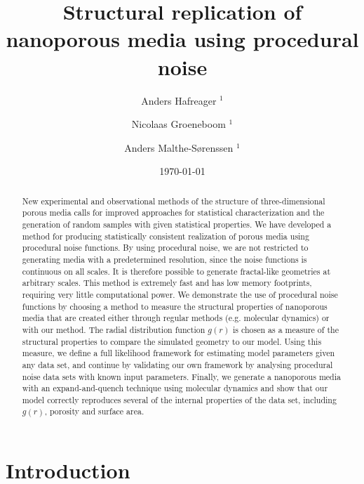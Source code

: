 \documentclass[aps,pre,twocolumn,letterpaper,floatfix,showpacs]{revtex4}
\begin{document}
\title{Structural replication of nanoporous media using procedural noise}
\author{Anders Hafreager $^{1}$} 
\author{Nicolaas Groeneboom $^{1}$} 
\author{Anders Malthe-S\o renssen $^1$}
\date{\today} 

\begin{abstract} 
New experimental and observational methods of the structure of three-dimensional porous media calls for improved approaches for statistical characterization and the generation of random samples with given statistical properties. 
We have developed a method for producing statistically consistent realization of porous media using procedural noise functions. By using procedural noise, we are not restricted to generating media with a predetermined resolution, since the noise functions is continuous on all scales. It is therefore possible to generate fractal-like geometries at arbitrary scales. This method is extremely fast and has low memory footprints, requiring very little computational power. We demonstrate the use of procedural noise functions by choosing a method to measure the structural properties of nanoporous media that are created either through regular methods (e.g. molecular dynamics) or with our method. The radial distribution function $g(r)$ is chosen as a measure of the structural properties to compare the simulated geometry to our model. Using this measure, we define a full likelihood framework for estimating model parameters given any data set, and continue by validating our own framework by analysing procedural noise data sets with known input parameters. Finally, we generate a nanoporous media with an expand-and-quench technique using molecular dynamics and show that our model correctly reproduces several of the internal properties of the data set, including $g(r)$, porosity and surface area. 
\end{abstract} 
 
\maketitle
 
\section{Introduction}
\end{document}
